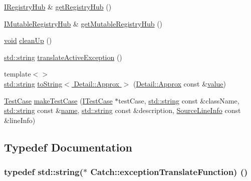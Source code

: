\begin{DoxyCompactItemize}
\item 
\hyperlink{struct_catch_1_1_i_registry_hub}{I\+Registry\+Hub} \& \hyperlink{namespace_catch_ac24b072979540bfd922e7d46e899f46f}{get\+Registry\+Hub} ()
\item 
\hyperlink{struct_catch_1_1_i_mutable_registry_hub}{I\+Mutable\+Registry\+Hub} \& \hyperlink{namespace_catch_ac9ddcc6d66079add9cb2a3140b8ae51e}{get\+Mutable\+Registry\+Hub} ()
\item 
\hyperlink{_s_d_l__opengles2__gl2ext_8h_ae5d8fa23ad07c48bb609509eae494c95}{void} \hyperlink{namespace_catch_a0f78e9afdebc6d4512d18e76fbf54b8c}{clean\+Up} ()
\item 
\hyperlink{_s_d_l__opengl__glext_8h_ae84541b4f3d8e1ea24ec0f466a8c568b}{std\+::string} \hyperlink{namespace_catch_adafff91485eeeeb9e9333f317cc0e3b1}{translate\+Active\+Exception} ()
\item 
{\footnotesize template$<$$>$ }\\\hyperlink{_s_d_l__opengl__glext_8h_ae84541b4f3d8e1ea24ec0f466a8c568b}{std\+::string} \hyperlink{namespace_catch_ac501c2b6bfe82978d699ddda37c53d13}{to\+String$<$ Detail\+::\+Approx $>$} (\hyperlink{class_catch_1_1_detail_1_1_approx}{Detail\+::\+Approx} const \&\hyperlink{_s_d_l__opengl__glext_8h_a8ad81492d410ff2ac11f754f4042150f}{value})
\item 
\hyperlink{class_catch_1_1_test_case}{Test\+Case} \hyperlink{namespace_catch_a2a784590bb5068810d3f6013fed1f1d3}{make\+Test\+Case} (\hyperlink{struct_catch_1_1_i_test_case}{I\+Test\+Case} $\ast$test\+Case, \hyperlink{_s_d_l__opengl__glext_8h_ae84541b4f3d8e1ea24ec0f466a8c568b}{std\+::string} const \&class\+Name, \hyperlink{_s_d_l__opengl__glext_8h_ae84541b4f3d8e1ea24ec0f466a8c568b}{std\+::string} const \&\hyperlink{_s_d_l__opengl__glext_8h_aaced7cfc21e7d37775d6921bb8177239}{name}, \hyperlink{_s_d_l__opengl__glext_8h_ae84541b4f3d8e1ea24ec0f466a8c568b}{std\+::string} const \&description, \hyperlink{struct_catch_1_1_source_line_info}{Source\+Line\+Info} const \&line\+Info)
\end{DoxyCompactItemize}


\subsection{Typedef Documentation}
\subsubsection[{\texorpdfstring{exception\+Translate\+Function}{exceptionTranslateFunction}}]{\setlength{\rightskip}{0pt plus 5cm}typedef {\bf std\+::string}($\ast$ Catch\+::exception\+Translate\+Function) ()}\hypertarget{namespace_catch_a14edb319150d3e108bbdef994f9eec2a}{}\label{namespace_catch_a14edb319150d3e108bbdef994f9eec2a}
